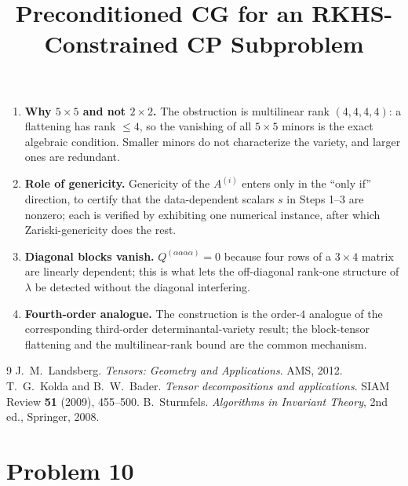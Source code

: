 \documentclass[11pt]{article}
\begin{document}
\begin{enumerate}\setlength\itemsep{4pt}
\item \textbf{Why $5\times5$ and not $2\times2$.} The obstruction is multilinear
rank $(4,4,4,4)$: a flattening has rank $\le4$, so the vanishing of all
$5\times5$ minors is the exact algebraic condition. Smaller minors do not
characterize the variety, and larger ones are redundant.
\item \textbf{Role of genericity.} Genericity of the $A^{(i)}$ enters only in the
``only if'' direction, to certify that the data-dependent scalars $s$ in
Steps 1–3 are nonzero; each is verified by exhibiting one numerical instance,
after which Zariski-genericity does the rest.
\item \textbf{Diagonal blocks vanish.} $Q^{(\alpha\alpha\alpha\alpha)}=0$ because
four rows of a $3\times4$ matrix are linearly dependent; this is what lets the
off-diagonal rank-one structure of $\lambda$ be detected without the diagonal
interfering.
\item \textbf{Fourth-order analogue.} The construction is the order-$4$ analogue
of the corresponding third-order determinantal-variety result; the block-tensor
flattening and the multilinear-rank bound are the common mechanism.
\end{enumerate}

\begin{thebibliography}{9}
 J.~M.~Landsberg.
  \emph{Tensors: Geometry and Applications}. AMS, 2012.
 T.~G.~Kolda and B.~W.~Bader.
  \emph{Tensor decompositions and applications}.
  SIAM Review \textbf{51} (2009), 455--500.
 B.~Sturmfels.
  \emph{Algorithms in Invariant Theory}, 2nd ed., Springer, 2008.
\end{thebibliography}

\endgroup

\clearpage
\section*{Problem 10}
\begingroup
\hypersetup{colorlinks=true,
            linkcolor=blue!50!black,
            citecolor=blue!50!black,
            urlcolor=blue!50!black}
\newcommand{\qtenR}{\mathbb{R}}
\newcommand{\qtenvecop}{\operatorname{vec}}
\newcommand{\qtendiag}{\operatorname{diag}}
\newcommand{\qtenTr}{\operatorname{Tr}}
\newcommand{\qtenKR}{\odot}            %
\newcommand{\qtenbigKR}{\bigodot}      %
\newcommand{\qtenhad}{\ast}            %
\newcommand{\qtenbF}{\bar F}
\newcommand{\qtenbB}{\bar B}
\newcommand{\qtenbW}{\bar W}
\newcommand{\qtenbD}{\bar D}
\newcommand{\qtenbd}{\bar d}
\newcommand{\qtenKhat}{\widehat K}
\newcommand{\qtenZhat}{\widehat Z}
\newcommand{\qtenHhat}{\widehat H}
\newtheorem{qtentheorem}{Theorem}
\newtheorem{qtenlemma}{Lemma}
\newtheorem{qtenproposition}{Proposition}
\title{Preconditioned CG for an RKHS-Constrained CP Subproblem}
\author{}
\date{}
\maketitle
\end{document}
